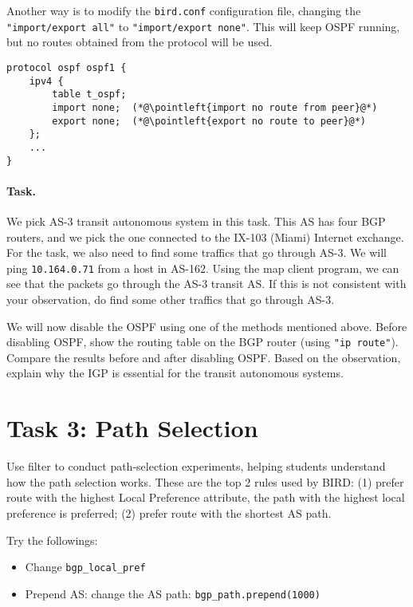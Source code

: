 Another way is to modify the \texttt{bird.conf} configuration file,
changing the \texttt{"import/export all"} to 
\texttt{"import/export none"}. This will keep OSPF running, but  
no routes obtained from the protocol will be used. 

\begin{lstlisting}
protocol ospf ospf1 {
    ipv4 {
        table t_ospf;
        import none;  (*@\pointleft{import no route from peer}@*) 
        export none;  (*@\pointleft{export no route to peer}@*) 
    };
    ...
}
\end{lstlisting}
 

\paragraph{Task.} We pick AS-3 transit autonomous system in this 
task. This AS has four BGP routers, and we pick the one 
connected to the IX-103 (Miami) Internet exchange.
For the task, we also need to find some traffics that 
go through AS-3. 
We will ping \texttt{10.164.0.71} from a host in AS-162. Using the 
map client program, we can see that the packets go through
the AS-3 transit AS. If this is not consistent with your observation,
do find some other traffics that go through AS-3. 


We will now disable the OSPF using one of the methods mentioned above.
Before disabling OSPF, show the routing table 
on the BGP router (using \texttt{"ip route"}). Compare the 
results before and after disabling OSPF. Based on the 
observation, explain why the IGP is essential for the transit 
autonomous systems. 



\section{Task 3: Path Selection} 

Use filter to conduct path-selection experiments, helping students
understand how the path selection works.
These are the top 2 rules used by BIRD: 
(1) prefer route with the highest Local Preference attribute,
the path with the highest local preference is preferred;
(2) prefer route with the shortest AS path.

Try the followings:
\begin{itemize}
  \item Change \texttt{bgp\_local\_pref} 
  \item Prepend AS: change the AS path: \texttt{bgp\_path.prepend(1000)} 
\end{itemize}
 

